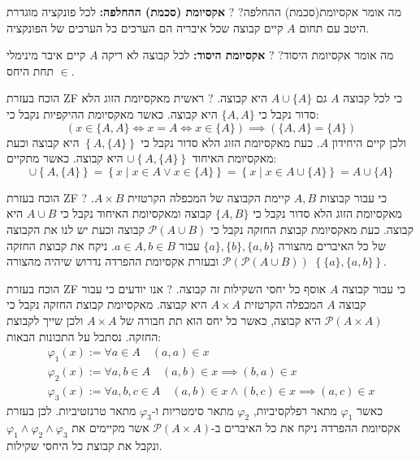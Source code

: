 \documentclass{tstextbook}
\begin{document}
מה אומר אקסיומת(סכמת) ההחלפה?
?
\textbf{אקסיומת (סכמת) ההחלפה:} לכל פונקציה מוגדרת היטב עם תחום \(A\) קיים קבוצה שכל איבריה הם הערכים כל הערכים של הפונקציה.

מה אומר אקסיומת היסוד?
?
\textbf{אקסיומת היסוד:} לכל קבוצה לא ריקה \(A\) קיים איבר מינימלי תחת היחס \(\in\).

הוכח בעזרת ZF כי לכל קבוצה \(A\) גם \(A\cup \{ A \}\) היא קבוצה.
?
ראשית מאקסיומת הזוג הלא סדור נקבל כי \(\{ A,A \}\) היא קבוצה. כאשר מאקסיומת ההיקפיות נקבל כי:
$$\left( x \in \{ A,A \}\iff x = A \iff x \in \{  A \}\right)\implies\left( \{ A,A \}=\{ A \} \right)$$
ולכן קיים היחידון \(A\). כעת מאקסיומת הזוג הלא סדור נקבל כי \(\left\{  A,\{ A \}  \right\}\) היא קבוצה וכעת מאקסיומת האיחוד \(\cup \left\{  A,\{ A \}  \right\}\) היא קבוצה. כאשר מתקיים:
$$\cup \left\{  A,\{ A \}  \right\}=\left\{  x\mid x \in A \lor x \in \{  A \}  \right\}=\left\{  x \mid x \in A\cup \{ A \}  \right\}=A\cup \{  A \}$$

הוכח בעזרת ZF כי עבור קבוצות \(A,B\) קיימת הקבוצה של המכפלה הקרטזית \(A\times B\).
?
מאקסיומת הזוג הלא סדור נקבל כי \(\{ A,B \}\) קבוצה ומאקסיומת האיחוד נקבל כי \(A\cup B\) היא קבוצה. כעת מאקסיומת קבוצת החזקה נקבל כי \(\mathcal{P}\left( A\cup B \right)\) קבוצה וכעת יש לנו את הקבוצה של כל האיברים מהצורה \(\{ a \},\{ b \},\{ a,b \}\) עבור \(a\in A,b \in B\). ניקח את קבוצת החזקה \(\mathcal{P}\left( \mathcal{P}\left( A\cup B \right) \right)\) ובעזרת אקסיומת ההפרדה נדרוש שיהיה מהצורה \(\left\{  \{ a \},\{ a,b \}  \right\}\).

הוכח בעזרת ZF כי עבור קבוצה \(A\) אוסף כל יחסי השקילות זה קבוצה.
?
אנו יודעים כי עבור קבוצה \(A\) המכפלה הקרטזית \(A\times A\) היא קבוצה. מאקסיומת קבוצת החזקה נקבל כי \(\mathcal{P}\left( A\times A \right)\) היא קבוצה, כאשר כל יחס הוא תת חבורה של \(A\times A\) ולכן שייך לקבוצת החזקה. נסתכל על התכונות הבאות:
\begin{gather*}\varphi_{1}(x):= \forall a \in A\quad  (a,a) \in x  \\\varphi_{2}(x):= \forall a,b \in A\quad  (a,b) \in x \implies (b,a) \in x \\\varphi_{3}(x):= \forall a,b,c \in A\quad (a,b) \in x\land(b,c)\in x\implies(a,c)\in x
\end{gather*}
כאשר \(\varphi_{1}\) מתאר רפלקסיביות, \(\varphi_{2}\) מתאר סימטריות ו-\(\varphi_{3}\) מתאר טרנזטיביות. לכן בעזרת אקסיומת ההפרדה ניקח את כל האיברים ב-\(\mathcal{P}\left( A\times A \right)\) אשר מקיימים את \(\varphi_{1}\land \varphi_{2}\land \varphi_{3}\) ונקבל את קבוצת כל היחסי שקילות.
\end{document}
